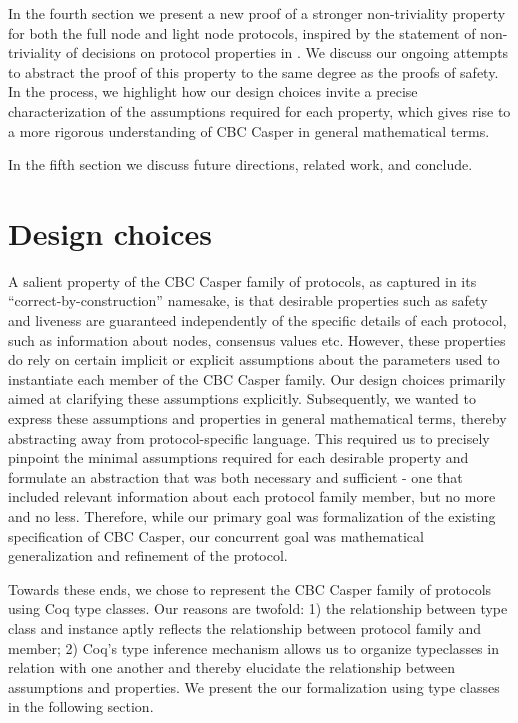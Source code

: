 \documentclass[runningheads]{llncs}
\begin{document}
In the fourth section we present a new proof of a stronger non-triviality property for both the full node and light node protocols, inspired by the statement of non-triviality of decisions on protocol properties in \cite{CBCfull}. We discuss our ongoing attempts to abstract the proof of this property to the same degree as the proofs of safety. In the process, we highlight how our design choices invite a precise characterization of the assumptions required for each property, which gives rise to a more rigorous understanding of CBC Casper in general mathematical terms.  

In the fifth section we discuss future directions, related work, and conclude. 

\section{Design choices} 
A salient property of the CBC Casper family of protocols, as captured in its ``correct-by-construction'' namesake, is that desirable properties such as safety and liveness are guaranteed independently of the specific details of each protocol, such as information about nodes, consensus values etc. However, these properties do rely on certain implicit or explicit assumptions about the parameters used to instantiate each member of the CBC Casper family. Our design choices primarily aimed at clarifying these assumptions explicitly. Subsequently, we wanted to express these assumptions and properties in general mathematical terms, thereby abstracting away from protocol-specific language. This required us to precisely pinpoint the minimal assumptions required for each desirable property and formulate an abstraction that was both necessary and sufficient - one that included relevant information about each protocol family member, but no more and no less. Therefore, while our primary goal was formalization of the existing specification of CBC Casper, our concurrent goal was mathematical generalization and refinement of the protocol. 

Towards these ends, we chose to represent the CBC Casper family of protocols using Coq type classes. Our reasons are twofold: 1) the relationship between type class and instance aptly reflects the relationship between protocol family and member; 2) Coq's type inference mechanism allows us to organize typeclasses in relation with one another and thereby elucidate the relationship between assumptions and properties. We present the our formalization using type classes in the following section. 
\end{document}
